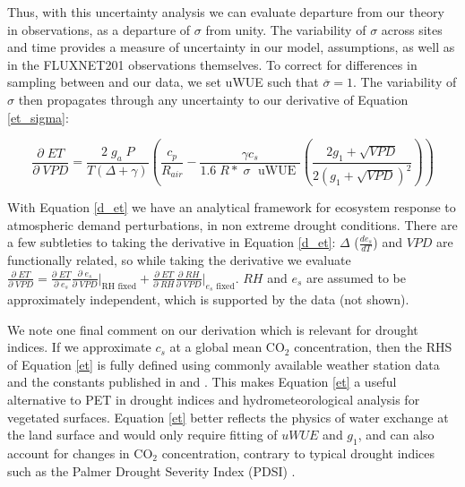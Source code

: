 \documentclass[draft,linenumbers]{agujournal}
\begin{document}
Thus, with this uncertainty analysis we can evaluate departure from our theory in observations, as a departure of $\sigma$ from unity. The variability of $\sigma$ across sites and time provides a measure of uncertainty in our model, assumptions, as well as in the FLUXNET201 observations themselves. To correct for differences in sampling between \cite{Zhou_2015} and our data, we set uWUE such that $\overline{\sigma} = 1$. The variability of $\sigma$ then propagates through any uncertainty to our derivative of Equation \ref{et_sigma}:

\begin{linenomath*}
  \begin{equation}
    \frac{\partial \;  ET}{\partial \; VPD} = \frac{2\; g_a \; P}{T(\Delta + \gamma)}   \left(\frac{ c_p}{R_{air}} -  \frac{\gamma c_s }{1.6 \; R*\; \sigma \; \text{ uWUE }} \left( \frac{2 g_1 + \sqrt{VPD}}{2 (g_1 + \sqrt{VPD})^2}\right) \right)
    \label{d_et}
  \end{equation}
\end{linenomath*}

With Equation \ref{d_et} we have an analytical framework for ecosystem response to atmospheric demand perturbations, in non extreme drought conditions. There are a few subtleties to taking the derivative in Equation \ref{d_et}: $\Delta$ ($\frac{d e_{s}}{d T}$) and $VPD$ are functionally related, so while taking the derivative we evaluate $\frac{\partial \; ET}{\partial \; VPD} = \frac{\partial \; ET} {\partial \; e_s} \frac{\partial \; e_s}{\partial \; VPD} \Big|_{\text{RH fixed}} + \frac{\partial \; ET}{\partial \; RH} \frac{\partial \; RH}{\partial \; VPD} \Big|_{\text{$e_s$ fixed}}$. $RH$ and $e_s$ are assumed to be approximately independent, which is supported by the data (not shown). 

We note one final comment on our derivation which is relevant for drought indices. If we approximate $c_s$ at a global mean CO$_2$ concentration, then the RHS of Equation \ref{et} is fully defined using commonly available weather station data and the constants published in \citet{Zhou_2015} and \citet{Lin_2015}. This makes Equation \ref{et} a useful alternative to PET in drought indices and hydrometeorological analysis for vegetated surfaces. Equation \ref{et} better reflects the physics of water exchange at the land surface and would only require fitting of $uWUE$ and $g_1$, and can also account for changes in CO$_2$ concentration, contrary to typical drought indices such as the Palmer Drought Severity Index (PDSI) \citep{Swann_2016}.
\end{document}
